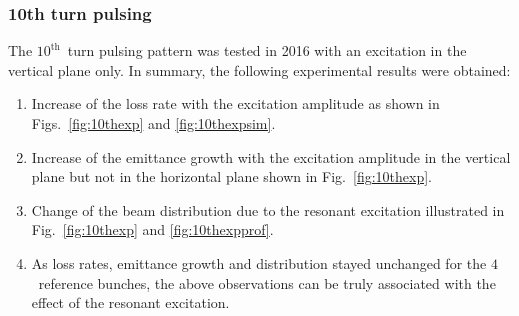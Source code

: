 \documentclass[%
 reprint,
 amsmath,amssymb,
 aps,
prstab,
]{revtex4-1}
\begin{document}
\subsubsection{10th turn pulsing\label{sec:simex10}}
The $10^{\mathrm{th}}$~turn pulsing pattern was tested in 2016 with an excitation in the vertical plane only. In summary, the following experimental results were obtained:
\begin{enumerate}
	\item Increase of the loss rate with the excitation amplitude as shown in Figs.~\ref{fig:10thexp} and \ref{fig:10thexpsim}.
	\item Increase of the emittance growth with the excitation amplitude in the vertical plane but not in the horizontal plane shown in Fig.~\ref{fig:10thexp}.
	\item Change of the beam distribution due to the resonant excitation illustrated in Fig.~\ref{fig:10thexp} and \ref{fig:10thexpprof}.
	\item As loss rates, emittance growth and distribution stayed unchanged for the $4$~reference bunches, the above observations can be truly associated with the effect of the resonant excitation.	
\end{enumerate}
\end{document}
